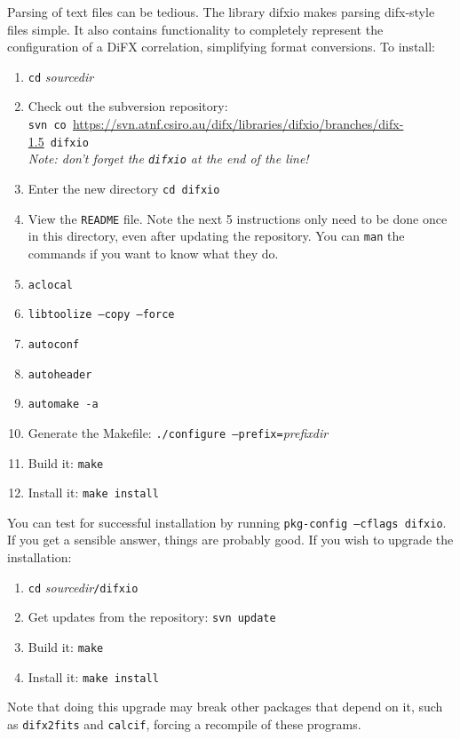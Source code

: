 Parsing of text files can be tedious.  
The library difxio makes parsing difx-style files simple.
It also contains functionality to completely represent the configuration of a DiFX correlation, simplifying format conversions.
To install:
\begin{enumerate}
\item {\tt cd} {\em sourcedir}
\item Check out the subversion repository: \\
{\tt svn co }\url{https://svn.atnf.csiro.au/difx/libraries/difxio/branches/difx-1.5}{\tt\ difxio} \\
{\em Note: don't forget the {\tt difxio} at the end of the line!}
\item Enter the new directory {\tt cd difxio}
\item View the {\tt README} file.  
Note the next 5 instructions only need to be done once in this directory, even after updating the repository.
You can {\tt man} the commands if you want to know what they do.
\item {\tt aclocal}  
\item {\tt libtoolize --copy --force}
\item {\tt autoconf}
\item {\tt autoheader}
\item {\tt automake -a} 
\item Generate the Makefile: {\tt ./configure --prefix=}{\em prefixdir}
\item Build it: {\tt make}
\item Install it: {\tt make install}
\end{enumerate}

You can test for successful installation by running {\tt pkg-config --cflags difxio}.  
If you get a sensible answer, things are probably good.
If you wish to upgrade the installation:
\begin{enumerate}
\item {\tt cd} {\em sourcedir}{\tt /difxio}
\item Get updates from the repository: {\tt svn update}
\item Build it: {\tt make}
\item Install it: {\tt make install}
\end{enumerate}

Note that doing this upgrade may break other packages that depend on it, such as {\tt difx2fits} and {\tt calcif}, forcing a recompile of these programs.









